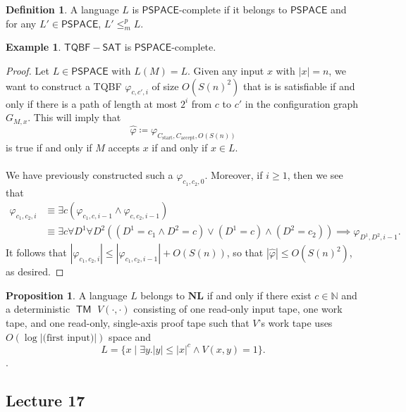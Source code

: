 \documentclass[10pt,letterpaper,cm]{nupset}
\theoremstyle{definition}
\newtheorem*{definition}{Definition}
\newtheorem{exmp}{Example}
\newtheorem{prop}{Proposition}
\newcommand{\N}{\mathbb N}
\newcommand{\1}{\mathbf{1}}
\newcommand{\0}{\vec 0}
\DeclareMathOperator{\TM}{\mathsf{TM}}
\begin{document}
\begin{definition}
A language $L$ is $\mathsf{PSPACE}$-complete if it belongs to $\mathsf{PSPACE}$ and for any $L' \in \mathsf{PSPACE}$, $L' \leq_m^p L$.
\end{definition}

\begin{exmp}
$\mathsf{TQBF{-}SAT} $ is $\mathsf{PSPACE}$-complete.
\end{exmp}
\begin{proof}
Let $L \in \mathsf{PSPACE}$ with $L(M) = L$. Given any input $x$ with $|x| =n$, we want to construct a TQBF $\varphi_{c, c', i}$ of size $O(S(n)^2)$ that is is satisfiable if and only if there is a path of length at most $2^i$ from $c$ to $c'$ in the configuration graph $G_{M,x}$. This will imply that $$\hat{\varphi}\coloneqq \varphi_{C_{\text{start}}, C_{\text{accept}}, O(S(n))}$$ is true if and only if $M$ accepts $x$ if and only if $x\in L$.
\\ \\ We have previously constructed such a $\varphi_{c_1, c_2, 0}$. Moreover, if $i\geq 1$, then we see that 
\begin{align*}
\varphi_{c_1, c_2, i} & \equiv \exists c(\varphi_{c_1, c, i-1} \land \varphi_{c, c_2, i-1})
\\ & \equiv \exists c \forall D^1 \forall D^2((D^1 = c_1 \land D^2 = c) \vee (D^1 = c) \land (D^2 = c_2)) \implies \varphi_{D^1, D^2, i-1}.
\end{align*}
It follows that $|\varphi_{c_1, c_2, i}|\leq |\varphi_{c_1, c_2, i-1}| +O(S(n))$, so that $|\hat{\varphi}| \leq O(S(n)^2)$, as desired.
\end{proof}

\begin{prop}
A language $L$ belongs to $\mathbf{NL}$ if and only if there exist $c\in \N$ and a deterministic $\TM$ $V(\cdot, \cdot)$ consisting of one read-only input tape, one work tape, and one read-only, single-axis proof tape  such that $V$'s work tape uses $O(\log{|\text{(first input)}|})$ space and $$L = \{ x \mid \exists y.|y| \leq |x|^{c} \land V(x,y) = 1\}.$$ .
\end{prop}

\subsection{Lecture 17}
\end{document}

